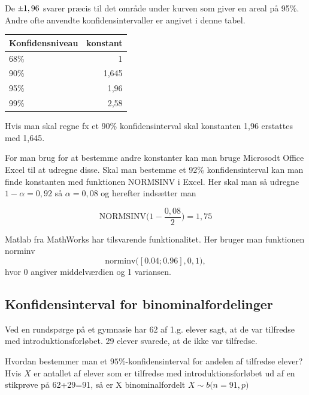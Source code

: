 \documentclass[11pt, a4paper]{article}
\newcommand{\plusminus}{\mathbin{\tikz [x=1.4ex,y=1.4ex,line width=.1ex] \draw (0.0,0)
-- (1.0,0) (0.5,0.08) -- (0.5,0.92) (0.0,0.5) -- (1.0,0.5);}}%
\begin{document}
De \(\plusminus 1,96\) svarer præcis til det område under kurven som giver en areal
på 95\%. Andre ofte anvendte konfidensintervaller er angivet i denne tabel.

\begin{table}[]
\centering
\begin{tabular}{@{}|l|r|@{}}
\toprule
Konfidensniveau & \multicolumn{1}{l|}{konstant} \\ \midrule
68\%            & 1                             \\ \midrule
90\%            & 1,645                         \\ \midrule
95\%            & 1,96                          \\ \midrule
99\%            & 2,58                          \\ \bottomrule
\end{tabular}
\end{table}

Hvis man skal regne fx et 90\% konfidensinterval skal konstanten 1,96 erstattes med
1,645.

For man brug for at bestemme andre konstanter kan man bruge Microsodt Office Excel
til at udregne disse. Skal man bestemme et 92\% konfidensinterval kan man finde
konstanten med funktionen NORMSINV i Excel. Her skal man så udregne
\(1-\alpha = 0,92\) så \(\alpha = 0,08\) og herefter indsætter man

\begin{equation}
  \mbox{NORMSINV} \Big( 1-\frac{0,08}{2} \Big) = 1,75
\end{equation}

Matlab fra MathWorks har tilsvarende funktionalitet. Her bruger man funktionen
norminv
\begin{equation}
  \mbox{norminv}\big([0.04; 0.96], 0, 1\big),
\end{equation}
hvor 0 angiver middelværdien og 1 variansen.

\subsection{Konfidensinterval for binominalfordelinger}
Ved en rundspørge på et gymnasie har 62 af 1.g. elever sagt, at de var tilfredse
med introduktionsforløbet. 29 elever svarede, at de ikke var tilfredse.

Hvordan bestemmer man et \(95\%\)-konfidens\-interval for andelen af tilfredse
elever? Hvis \(X\) er antallet af elever som er tilfredse med introduktionsforløbet
ud af en stikprøve på 62+29=91, så er X binominalfordelt
\(X \sim b\big(n=91,p \big)\)
\end{document}
